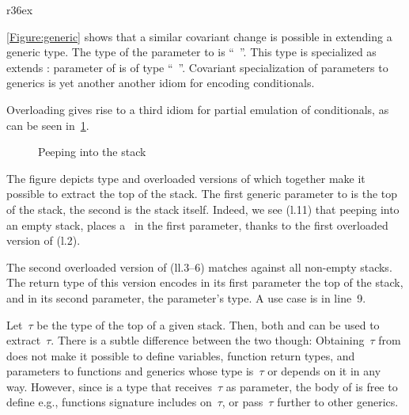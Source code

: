 \begin{wrapfigure}[6]r{36ex}
  \caption{\label{Figure:generic} Covariance of parameters to generics}
\end{wrapfigure}

\cref{Figure:generic} shows that a similar covariant change is possible 
  in extending a generic type.
The type of the parameter  
  to  is ``\mbox{  }''.
This type is specialized as  extends :
  parameter  of  is of type  
  ``\mbox{  }''.
Covariant specialization of parameters to generics 
  is yet another another idiom for encoding conditionals.

Overloading gives rise to a third idiom for partial emulation of conditionals, as can be seen
  in~\cref{Figure:peep}.

\begin{figure}[htb]%
  \caption{Peeping into the stack}%
  \label{Figure:peep}%
  \lstset{style=numbered}
\end{figure}

The figure depicts type  and overloaded versions of  which 
  together make it possible to extract the top of the stack.
The first generic parameter to  is the top of the stack, the second is the stack itself.
Indeed, we see (l.11) that peeping into an empty stack, places a~
  in the first parameter, thanks to the first overloaded version of  (l.2).

The second overloaded version of  (ll.3--6) matches
 against all non-empty stacks. 
The return type
 of this version encodes
 in its first parameter
 the top of the stack, and 
  in its second parameter, the parameter's type.
A use case is in line~9.

Let~$τ$ be the type of the top of a given stack.
Then, both  and  can be used to extract~$τ$.
There is a subtle difference between the two though:
Obtaining~$τ$ from  does
  not make it possible to define variables, function return types, and
  parameters to functions and generics whose type is~$τ$ or depends on it in any way.
However, since  is a type that receives~$τ$ as parameter,
  the body of  is free to define e.g., functions signature includes on~$τ$,
  or pass~$τ$ further to other generics.
